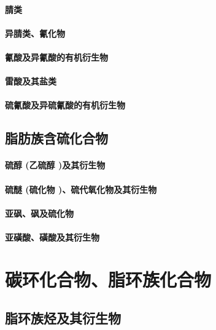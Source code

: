 \documentclass[UTF8]{../03-Chemistry}
\begin{document}
        \subsubsection{腈类}
        \subsubsection{异腈类、氰化物}
        \subsubsection{氰酸及异氰酸的有机衍生物}
        \subsubsection{雷酸及其盐类}
        \subsubsection{硫氰酸及异硫氰酸的有机衍生物}


\section{脂肪族含硫化合物}
    \subsubsection{硫醇 (乙硫醇 )及其衍生物}
    \subsubsection{硫醚 (硫化物 )、硫代氧化物及其衍生物}
    \subsubsection{亚砜、砜及硫化物}
    \subsubsection{亚磺酸、磺酸及其衍生物}









\chapter{碳环化合物、脂环族化合物}
\section{脂环族烃及其衍生物}
\end{document}

